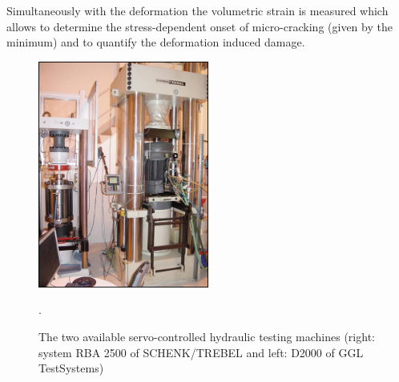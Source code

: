 Simultaneously with the deformation the volumetric strain is measured which allows to determine the 
stress-dependent onset of micro-cracking (given by the minimum) and to quantify the deformation induced damage.

\begin{figure}[!ht]
\centering
\includegraphics[width=0.5\textwidth]{./figures/ifg-lab-photo3.png}
\caption{The two available servo-controlled hydraulic testing machines (right: system RBA 2500 of SCHENK/TREBEL and left: D2000 of GGL TestSystems)}.
\label{fig:ifglabph2}
\end{figure}
